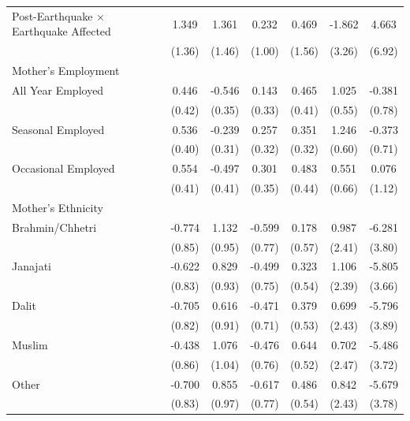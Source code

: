 \begin{longtable}{l*{6}{c}}
Post-Earthquake × Earthquake Affected & 1.349 & 1.361 & 0.232 & 0.469 & -1.862 & 4.663 \\
                    & (1.36) & (1.46) & (1.00) & (1.56) & (3.26) & (6.92) \\
\multicolumn{7}{l}{Mother's Employment} \\
\hspace{1em}All Year Employed & 0.446 & -0.546 & 0.143 & 0.465 & 1.025\sym{*} & -0.381 \\
                    & (0.42) & (0.35) & (0.33) & (0.41) & (0.55) & (0.78) \\
\hspace{1em}Seasonal Employed & 0.536 & -0.239 & 0.257 & 0.351 & 1.246\sym{**} & -0.373 \\
                    & (0.40) & (0.31) & (0.32) & (0.32) & (0.60) & (0.71) \\
\hspace{1em}Occasional Employed & 0.554 & -0.497 & 0.301 & 0.483 & 0.551 & 0.076 \\
                    & (0.41) & (0.41) & (0.35) & (0.44) & (0.66) & (1.12) \\
\multicolumn{7}{l}{Mother's Ethnicity} \\
\hspace{1em}Brahmin/Chhetri & -0.774 & 1.132 & -0.599 & 0.178 & 0.987 & -6.281 \\
                    & (0.85) & (0.95) & (0.77) & (0.57) & (2.41) & (3.80) \\
\hspace{1em}Janajati & -0.622 & 0.829 & -0.499 & 0.323 & 1.106 & -5.805 \\
                    & (0.83) & (0.93) & (0.75) & (0.54) & (2.39) & (3.66) \\
\hspace{1em}Dalit & -0.705 & 0.616 & -0.471 & 0.379 & 0.699 & -5.796 \\
                    & (0.82) & (0.91) & (0.71) & (0.53) & (2.43) & (3.89) \\
\hspace{1em}Muslim & -0.438 & 1.076 & -0.476 & 0.644 & 0.702 & -5.486 \\
                    & (0.86) & (1.04) & (0.76) & (0.52) & (2.47) & (3.72) \\
\hspace{1em}Other & -0.700 & 0.855 & -0.617 & 0.486 & 0.842 & -5.679 \\
                    & (0.83) & (0.97) & (0.77) & (0.54) & (2.43) & (3.78) \\

\end{longtable}
